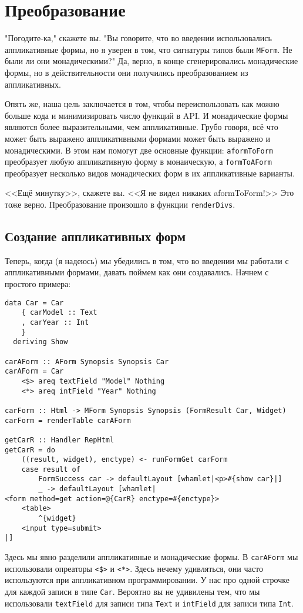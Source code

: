 \section{Преобразование}
"Погодите-ка," скажете вы. "Вы говорите, что во введении использовались аппликативные
формы, но я уверен в том, что сигнатуры типов были \lstinline'MForm'. Не были ли
они монадическими?" Да, верно, в конце сгенерировались монадические формы, но в
действительности они получились преобразованием из аппликативных.

Опять же, наша цель заключается в том, чтобы переиспользовать как можно больше кода и
минимизировать число функций в API. И монадические формы являются более
выразительными, чем аппликативные. Грубо говоря, всё что может быть выражено
аппликативными формами может быть выражено и монадическими. В этом нам помогут две
основные функции: \lstinline'aformToForm' преобразует любую аппликативную форму в
монаическую, а \lstinline'formToAForm' преобразует несколько видов монадических форм в их
аппликативные варианты.

<<Ещё минутку>>, скажете вы. <<Я не видел никаких aformToForm!>> Это тоже верно.
Преобразование произошло в функции \lstinline'renderDivs'.

\subsection{Создание аппликативных форм}
Теперь, когда (я надеюсь) мы убедились в том, что во введении мы работали с
аппликативными формами, давать поймем как они создавались. Начнем с простого примера:

\begin{lstlisting}
data Car = Car
    { carModel :: Text
    , carYear :: Int
    }
  deriving Show

carAForm :: AForm Synopsis Synopsis Car
carAForm = Car
    <$> areq textField "Model" Nothing
    <*> areq intField "Year" Nothing

carForm :: Html -> MForm Synopsis Synopsis (FormResult Car, Widget)
carForm = renderTable carAForm

getCarR :: Handler RepHtml
getCarR = do
    ((result, widget), enctype) <- runFormGet carForm
    case result of
        FormSuccess car -> defaultLayout [whamlet|<p>#{show car}|]
        _ -> defaultLayout [whamlet|
<form method=get action=@{CarR} enctype=#{enctype}>
    <table>
        ^{widget}
    <input type=submit>
|]
\end{lstlisting}
Здесь мы явно разделили аппликативные и монадические формы. В \lstinline'carAForm' мы
использовали опреаторы \lstinline'<$>' и \lstinline'<*>'. Здесь нечему удивляться, они
часто используются при аппликативном программировании. У нас про одной строчке для
каждой записи в типе \lstinline'Car'. Вероятно вы не удивилены тем, что мы использовали 
\lstinline'textField' для записи типа \lstinline'Text' и \lstinline'intField' для записи
типа \lstinline'Int'.

